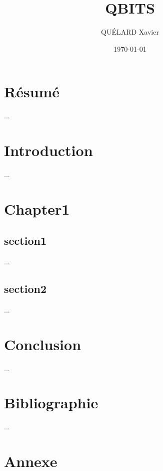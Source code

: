 \documentclass[a4paper,12pt]{report}
\title{QBITS}
\author{QUÉLARD Xavier}
\date{ \today{} }
\newcommand{\para}[1]{\par{#1}\\}
\begin{document}
%
%

%
\maketitle

%
%

\chapter*{Résumé}

\para{
	...
}

%
%

%
%

\tableofcontents

%
%

\chapter*{Introduction}

\para{
	...
}

\chapter{Chapter1}

%
%

	\section{section1}

\para{
	...
}

	\section{section2}

\para{
	...
}

%
%


\chapter*{Conclusion}

\para{
	...
}

\chapter*{Bibliographie}

\para{
	...
}


\chapter*{Annexe}
\end{document}
